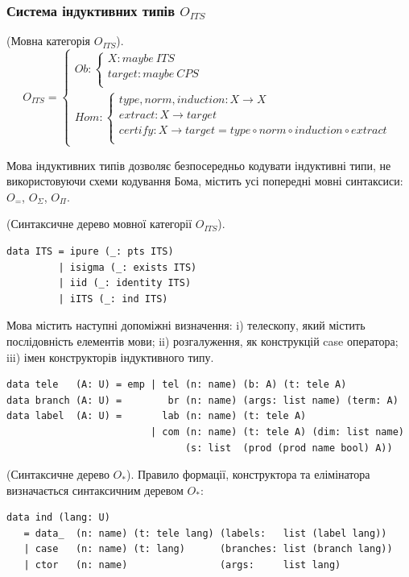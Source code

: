 \begin{definition}
\newpage
\subsubsection{Система індуктивних типів $O_{ITS}$}

\begin{definition} (Мовна категорія $O_{ITS}$).
$$
O_{ITS} =
\begin{cases}
Ob: \begin{cases}
X: maybe\ ITS \\
target: maybe\ CPS \\
\end{cases} \\
Hom: \begin{cases}
type,norm,induction: X \rightarrow X \\
extract: X \rightarrow target \\
certify: X \rightarrow target = type \circ norm \circ induction \circ extract \\
\end{cases}
\end{cases}
$$

Мова індуктивних типів дозволяє безпосередньо кодувати індуктивні типи,
не використовуючи схеми кодування Бома, містить усі попередні мовні синтаксиси:
$O_=$, $O_\Sigma$, $O_\Pi$.

\begin{definition} (Синтаксичне дерево мовної категорії $O_{ITS}$).
\begin{lstlisting}
data ITS = ipure (_: pts ITS)
         | isigma (_: exists ITS)
         | iid (_: identity ITS)
         | iITS (_: ind ITS)
\end{lstlisting}

Мова містить наступні допоміжні визначення: i) телескопу,
який містить послідовність елементів мови; ii) розгалуження,
як конструкцій case оператора; iii) імен конструкторів індуктивного типу.

\begin{lstlisting}
data tele   (A: U) = emp | tel (n: name) (b: A) (t: tele A)
data branch (A: U) =        br (n: name) (args: list name) (term: A)
data label  (A: U) =       lab (n: name) (t: tele A)
                         | com (n: name) (t: tele A) (dim: list name)
                               (s: list  (prod (prod name bool) A))
\end{lstlisting}

\begin{definition} (Синтаксичне дерево $O_*$).
Правило формації, конструктора та елімінатора визначається синтаксичним деревом $O_*$:
\begin{lstlisting}
data ind (lang: U)
   = data_  (n: name) (t: tele lang) (labels:   list (label lang))
   | case   (n: name) (t: lang)      (branches: list (branch lang))
   | ctor   (n: name)                (args:     list lang)
\end{lstlisting}


\end{definition}
\end{definition}
\end{definition}
\end{definition}
